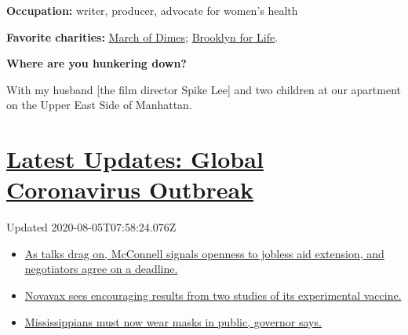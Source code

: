 \textbf{Occupation:} writer, producer, advocate for women's health

\textbf{Favorite charities:}
\href{https://www.marchofdimes.org/giving/support-general.aspx?\&utm_source=google\&utm_medium=cpc\&utm_campaign=alwayson\&utm_content=nonbrand\&utm_term=march\%20of\%20dimes\%20website\&DonationTrackingParam1=alwayson_google\&gclid=EAIaIQobChMI7oXbnKXF6QIVA4vICh1rKA6bEAAYASAAEgJDSPD_BwE\&gclsrc=aw.ds}{March
of Dimes}; \href{https://www.brooklynforlife.org}{Brooklyn for Life}.

\textbf{Where are you hunkering down?}

With my husband {[}the film director Spike Lee{]} and two children at
our apartment on the Upper East Side of Manhattan.

\hypertarget{latest-updates-global-coronavirus-outbreak}{%
\section{\texorpdfstring{\href{https://www.nytimes3xbfgragh.onion/2020/08/04/world/coronavirus-cases.html?action=click\&pgtype=Article\&state=default\&region=MAIN_CONTENT_1\&context=storylines_live_updates}{Latest
Updates: Global Coronavirus
Outbreak}}{Latest Updates: Global Coronavirus Outbreak}}\label{latest-updates-global-coronavirus-outbreak}}

Updated 2020-08-05T07:58:24.076Z

\begin{itemize}
\tightlist
\item
  \href{https://www.nytimes3xbfgragh.onion/2020/08/04/world/coronavirus-cases.html?action=click\&pgtype=Article\&state=default\&region=MAIN_CONTENT_1\&context=storylines_live_updates\#link-762df92}{As
  talks drag on, McConnell signals openness to jobless aid extension,
  and negotiators agree on a deadline.}
\item
  \href{https://www.nytimes3xbfgragh.onion/2020/08/04/world/coronavirus-cases.html?action=click\&pgtype=Article\&state=default\&region=MAIN_CONTENT_1\&context=storylines_live_updates\#link-1228a480}{Novavax
  sees encouraging results from two studies of its experimental
  vaccine.}
\item
  \href{https://www.nytimes3xbfgragh.onion/2020/08/04/world/coronavirus-cases.html?action=click\&pgtype=Article\&state=default\&region=MAIN_CONTENT_1\&context=storylines_live_updates\#link-794484ed}{Mississippians
  must now wear masks in public, governor says.}
\end{itemize}

